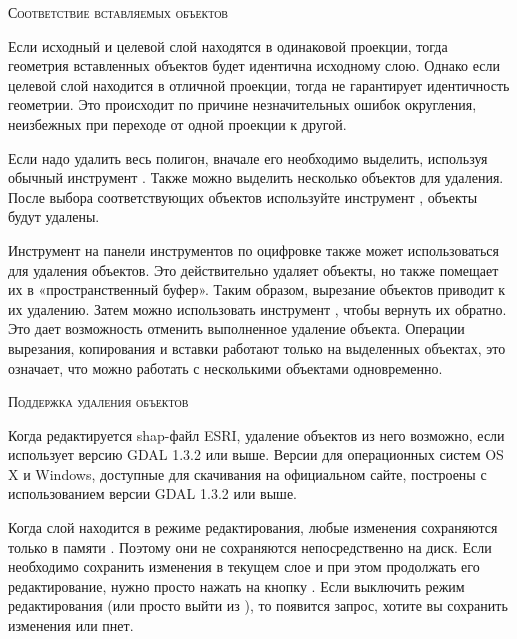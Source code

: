 \begin{Tip}\caption{\textsc{Соответствие вставляемых объектов}}
Если исходный и целевой слой находятся в одинаковой проекции, тогда
геометрия вставленных объектов будет идентична исходному слою. Однако если
целевой слой находится в отличной проекции, тогда \qg не гарантирует
идентичность геометрии. Это происходит по причине незначительных ошибок
округления, неизбежных при переходе от одной проекции к другой.
\end{Tip}


Если надо удалить весь полигон, вначале его необходимо выделить, используя
обычный инструмент . Также можно
выделить несколько объектов для удаления. После выбора соответствующих
объектов используйте инструмент
, объекты будут удалены.

Инструмент  на панели
инструментов по оцифровке также может использоваться для удаления объектов.
Это действительно удаляет объекты, но также помещает их в «пространственный
буфер». Таким образом, вырезание объектов приводит к их удалению. Затем можно
использовать инструмент ,
чтобы вернуть их обратно. Это дает возможность отменить выполненное удаление
объекта. Операции вырезания, копирования и вставки работают только на
выделенных объектах, это означает, что можно работать с несколькими объектами
одновременно.

\begin{Tip}\caption{\textsc{Поддержка удаления объектов}}
Когда редактируется shap-файл ESRI, удаление объектов из него возможно, если
\qg использует версию GDAL 1.3.2 или выше. Версии \qg для операционных
систем OS X и Windows, доступные для скачивания на официальном сайте,
построены с использованием версии GDAL 1.3.2 или выше.
\end{Tip}


Когда слой находится в режиме редактирования, любые изменения сохраняются
только в памяти \qg. Поэтому они не сохраняются непосредственно на диск.
Если необходимо сохранить изменения в текущем слое и при этом продолжать
его редактирование, нужно просто нажать на кнопку
. Если выключить режим
редактирования 
(или просто выйти из \qg ), то появится запрос, хотите вы сохранить
изменения или пнет.

